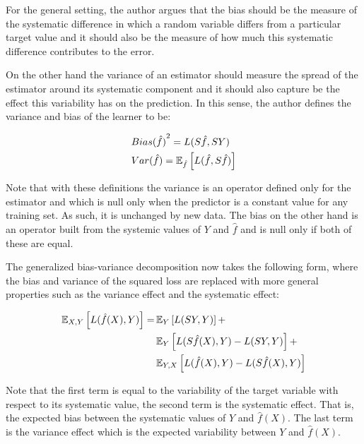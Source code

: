For the general setting, the author argues that the bias should be the measure of the systematic difference in which a random variable differs from a particular target value and it should also be the measure of how much this systematic difference contributes to the error.

On the other hand the variance of an estimator should measure the spread of the estimator around its systematic component and it should also capture be the effect this variability has on the prediction. In this sense, the author defines the variance and bias of the learner to be:

\begin{equation}
\begin{split}
& {Bias(\hat{f})}^2 = L(S\hat{f},SY) \\
& Var(\hat{f}) = \operatorname{\mathbb{E}}_{\hat{f}} \left[ L(\hat{f} , S\hat{f}) \right]
\end{split}
\end{equation}

Note that with these definitions the variance is an operator defined only for the estimator and which is null only when the predictor is a constant value for any training set. As such, it is unchanged by new data. The bias on the other hand is an operator built from the systemic values of $Y$ and $\hat{f}$ and is null only if both of these are equal.


The generalized bias-variance decomposition now takes the following form, where the bias and variance of the squared loss are replaced with more general properties such as the variance effect and the systematic effect:

\begin{equation}
\begin{split}
\operatorname{\mathbb{E}}_{X,Y} \left[ L(\hat{f}(X),Y )\right] = & \operatorname{\mathbb{E}}_{Y} \left[ L(SY,Y )\right] + \\
 & \operatorname{\mathbb{E}}_{Y} \left[ L(S\hat{f}(X),Y ) - L(SY,Y )\right] + \\
 & \operatorname{\mathbb{E}}_{Y,X} \left[ L(\hat{f}(X),Y ) - L(S\hat{f}(X),Y )\right]
\end{split}
\end{equation}

Note that the first term is equal to the variability of the target variable with respect to its systematic value, the second term is the systematic effect. That is, the expected bias between the systematic values of $Y$ and $\hat{f}(X)$. The last term is the variance effect which is the expected variability between $Y$ and $\hat{f}(X)$.

